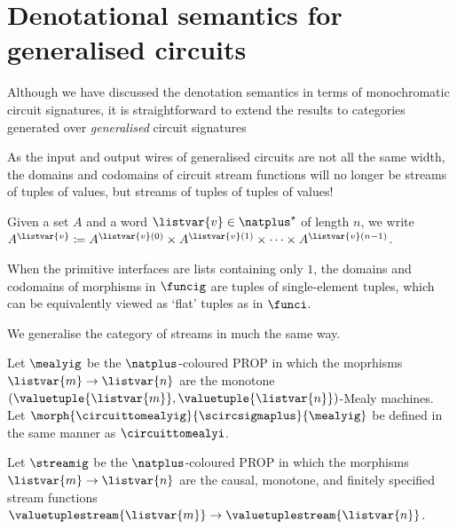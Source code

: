 \section{Denotational semantics for generalised circuits}

Although we have discussed the denotation semantics in terms of monochromatic
circuit signatures, it is straightforward to extend the results to categories
generated over \emph{generalised} circuit signatures

As the input and output wires of generalised circuits are not all the same
width, the domains and
codomains of circuit stream functions will no longer be streams of tuples of
values, but streams of tuples of tuples of values!

\begin{notation}
    Given a set \(A\) and a word \(\listvar{v} \in \natplus^\star\) of
    length \(n\), we write \(
    A^{\listvar{v}}
    \coloneqq
    A^{\listvar{v}(0)}
    \times
    A^{\listvar{v}(1)}
    \times
    \dots
    \times
    A^{\listvar{v}(n-1)}
    \).
\end{notation}

When the primitive interfaces are lists containing only \(1\), the domains and
codomains of morphisms in \(\funcig\) are tuples of single-element tuples,
which can be equivalently viewed as `flat' tuples as in \(\funci\).

We generalise the category of streams in much the same way.

\begin{definition}
    Let \(\mealyig\) be the \(\natplus\)-coloured PROP in which the moprhisms
    \(\listvar{m} \to \listvar{n}\) are the monotone
    \((\valuetuple{\listvar{m}}, \valuetuple{\listvar{n}})\)-Mealy machines.
    Let \(\morph{\circuittomealyig}{\scircsigmaplus}{\mealyig}\) be defined
    in the same manner as \(\circuittomealyi\).
\end{definition}

\begin{definition}
    Let \(\streamig\) be the \(\natplus\)-coloured PROP in which the morphisms
    \(\listvar{m} \to \listvar{n}\) are the causal, monotone, and finitely
    specified stream functions \(
    \valuetuplestream{\listvar{m}} \to \valuetuplestream{\listvar{n}}
    \).
\end{definition}




\begin{corollary}

\end{corollary}
